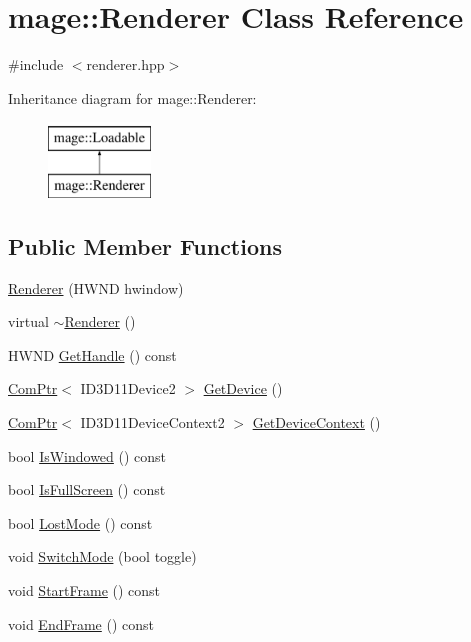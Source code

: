 \hypertarget{classmage_1_1_renderer}{}\section{mage\+:\+:Renderer Class Reference}
\label{classmage_1_1_renderer}


{\ttfamily \#include $<$renderer.\+hpp$>$}

Inheritance diagram for mage\+:\+:Renderer\+:\begin{figure}[H]
\begin{center}
\leavevmode
\includegraphics[height=2.000000cm]{classmage_1_1_renderer}
\end{center}
\end{figure}
\subsection*{Public Member Functions}
\begin{DoxyCompactItemize}
\item 
\hyperlink{classmage_1_1_renderer_a762dcda433c319af237d1dfd9bc6095f}{Renderer} (H\+W\+ND hwindow)
\item 
virtual \hyperlink{classmage_1_1_renderer_a997e041f28cc71d069d1ab7d29fe6ced}{$\sim$\+Renderer} ()
\item 
H\+W\+ND \hyperlink{classmage_1_1_renderer_a11d47495a47c58a0f67aae3110f9f519}{Get\+Handle} () const
\item 
\hyperlink{namespacemage_ae74f374780900893caa5555d1031fd79}{Com\+Ptr}$<$ I\+D3\+D11\+Device2 $>$ \hyperlink{classmage_1_1_renderer_a872e88f421405b06a995a6fb231d59ec}{Get\+Device} ()
\item 
\hyperlink{namespacemage_ae74f374780900893caa5555d1031fd79}{Com\+Ptr}$<$ I\+D3\+D11\+Device\+Context2 $>$ \hyperlink{classmage_1_1_renderer_a9c0c9254fb8295e415c80fff8de99f82}{Get\+Device\+Context} ()
\item 
bool \hyperlink{classmage_1_1_renderer_a1de1804c1eedae7dc12435a520a10b9c}{Is\+Windowed} () const
\item 
bool \hyperlink{classmage_1_1_renderer_a5ae3220e19c68f47a8e4d55e3ced4694}{Is\+Full\+Screen} () const
\item 
bool \hyperlink{classmage_1_1_renderer_afdde83a1e2bc9288f000fb2575c525d0}{Lost\+Mode} () const
\item 
void \hyperlink{classmage_1_1_renderer_a9004ab608659188900c808eacb5f873c}{Switch\+Mode} (bool toggle)
\item 
void \hyperlink{classmage_1_1_renderer_a5fea21434ad2ac5bcd9ca09cf5f41852}{Start\+Frame} () const
\item 
void \hyperlink{classmage_1_1_renderer_a4932c51d0f6e56269712024d2d0322ef}{End\+Frame} () const
\end{DoxyCompactItemize}
